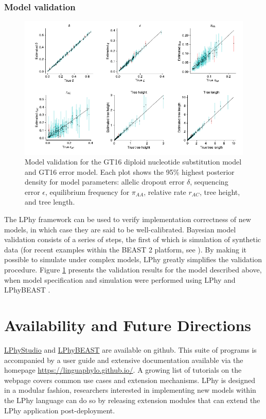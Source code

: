 \documentclass[10pt,letterpaper,table]{article}
\theoremstyle{definition}
\begin{document}
\subsubsection*{Model validation}
\begin{figure}[!h]
    \includegraphics{figs_plos/Fig4.pdf}
    \caption{Model validation for the GT16 diploid nucleotide substitution model and GT16 error model. Each plot shows the 95\% highest posterior density for model parameters: allelic dropout error $\delta$, sequencing error $\epsilon$, equilibrium frequency for $\pi_{AA}$, relative rate $r_{AC}$, tree height, and tree length. }
    \label{fig_validation}
\end{figure}

\noindent The LPhy framework can be used to verify implementation correctness of new models, in which case they are said to be well-calibrated.
Bayesian model validation consists of a series of steps, the first of which is simulation of synthetic data (for recent examples within the BEAST 2 platform, see \cite{gaboriau20,chen2022accounting}). 
By making it possible to simulate under complex models, LPhy greatly simplifies the validation procedure.
Figure \ref{fig_validation} presents the validation results for the model described above, when model specification and simulation were performed using LPhy and LPhyBEAST \cite{chen2022accounting}.

\section*{Availability and Future Directions}
\href{https://github.com/LinguaPhylo/linguaPhylo}{LPhyStudio} and \href{https://github.com/LinguaPhylo/LPhyBeast}{LPhyBEAST} are available on github. 
This suite of programs is accompanied by a user guide and extensive documentation available via the homepage \url{https://linguaphylo.github.io/}.
A growing list of tutorials on the webpage covers common use cases and extension mechanisms. 
LPhy is designed in a modular fashion, researchers interested in implementing new models within the LPhy language can do so by releasing extension modules that can extend the LPhy application post-deployment.
\end{document}
